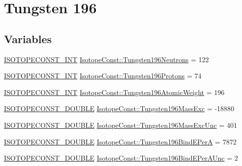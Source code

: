 \hypertarget{group___isotope_const-_tungsten-_w196}{}\section{Tungsten 196}
\label{group___isotope_const-_tungsten-_w196}
\subsection*{Variables}
\begin{DoxyCompactItemize}
\item 
\mbox{\hyperlink{group___isotope_const-_macros_ga5f18360b3e99483a35c32d789e62621c}{I\+S\+O\+T\+O\+P\+E\+C\+O\+N\+S\+T\+\_\+\+I\+NT}} \mbox{\hyperlink{group___isotope_const-_tungsten-_w196_ga8ada411fbec82ef8b5c00b6df602b960}{Isotope\+Const\+::\+Tungsten196\+Neutrons}} = 122
\item 
\mbox{\hyperlink{group___isotope_const-_macros_ga5f18360b3e99483a35c32d789e62621c}{I\+S\+O\+T\+O\+P\+E\+C\+O\+N\+S\+T\+\_\+\+I\+NT}} \mbox{\hyperlink{group___isotope_const-_tungsten-_w196_ga72644510aff9b38582b800a9c5c9fde2}{Isotope\+Const\+::\+Tungsten196\+Protons}} = 74
\item 
\mbox{\hyperlink{group___isotope_const-_macros_ga5f18360b3e99483a35c32d789e62621c}{I\+S\+O\+T\+O\+P\+E\+C\+O\+N\+S\+T\+\_\+\+I\+NT}} \mbox{\hyperlink{group___isotope_const-_tungsten-_w196_gacd93d5aef6bbcc28ec183fdf4d5f6525}{Isotope\+Const\+::\+Tungsten196\+Atomic\+Weight}} = 196
\item 
\mbox{\hyperlink{group___isotope_const-_macros_ga8f45a7272ce02c0b4c65c44636ed719a}{I\+S\+O\+T\+O\+P\+E\+C\+O\+N\+S\+T\+\_\+\+D\+O\+U\+B\+LE}} \mbox{\hyperlink{group___isotope_const-_tungsten-_w196_ga5c89d29392b48868a7dc09e25f6405bd}{Isotope\+Const\+::\+Tungsten196\+Mass\+Exc}} = -\/18880
\item 
\mbox{\hyperlink{group___isotope_const-_macros_ga8f45a7272ce02c0b4c65c44636ed719a}{I\+S\+O\+T\+O\+P\+E\+C\+O\+N\+S\+T\+\_\+\+D\+O\+U\+B\+LE}} \mbox{\hyperlink{group___isotope_const-_tungsten-_w196_ga7d3552664f18eb4810494edbcf453649}{Isotope\+Const\+::\+Tungsten196\+Mass\+Exc\+Unc}} = 401
\item 
\mbox{\hyperlink{group___isotope_const-_macros_ga8f45a7272ce02c0b4c65c44636ed719a}{I\+S\+O\+T\+O\+P\+E\+C\+O\+N\+S\+T\+\_\+\+D\+O\+U\+B\+LE}} \mbox{\hyperlink{group___isotope_const-_tungsten-_w196_gada98f4fd24dca69a6ecb6b9e6402e609}{Isotope\+Const\+::\+Tungsten196\+Bind\+E\+PerA}} = 7872
\item 
\mbox{\hyperlink{group___isotope_const-_macros_ga8f45a7272ce02c0b4c65c44636ed719a}{I\+S\+O\+T\+O\+P\+E\+C\+O\+N\+S\+T\+\_\+\+D\+O\+U\+B\+LE}} \mbox{\hyperlink{group___isotope_const-_tungsten-_w196_ga850a5f7edfe1494b5cd6b4a23cff60f4}{Isotope\+Const\+::\+Tungsten196\+Bind\+E\+Per\+A\+Unc}} = 2

\end{DoxyCompactItemize}
